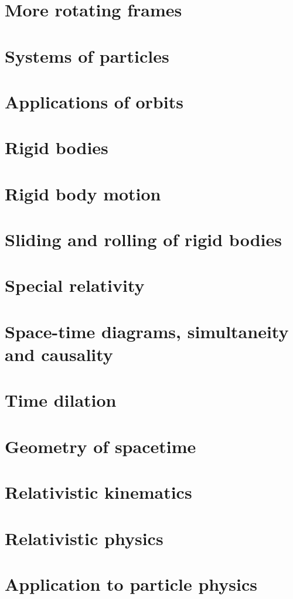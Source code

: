 \documentclass{article}
\begin{document}
\section{More rotating frames}

\section{Systems of particles}

\section{Applications of orbits}

\section{Rigid bodies}

\section{Rigid body motion}

\section{Sliding and rolling of rigid bodies}

\section{Special relativity}

\section{Space-time diagrams, simultaneity and causality}

\section{Time dilation}

\section{Geometry of spacetime}

\section{Relativistic kinematics}

\section{Relativistic physics}

\section{Application to particle physics}

\end{document}
